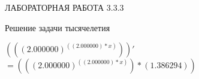 \documentclass[a4paper, 12 pt]{article}
\begin{document}
	\begin{center}
	ЛАБОРАТОРНАЯ РАБОТА 3.3.3

	Решение задачи тысячелетия
	\end{center}
	\newpage
	$\left((\left(2.000000\right)^{(\left(2.000000\right)*x)})\right)'$
	$= ((\left(2.000000\right)^{(\left(2.000000\right)*x)})*\left(1.386294\right))$
\end{document}

